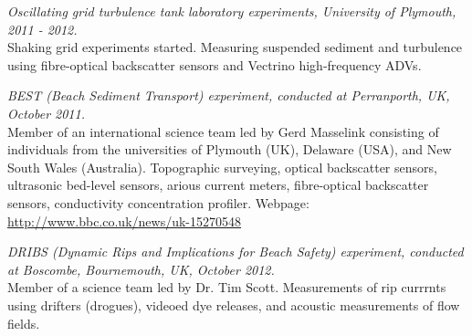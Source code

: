 \documentclass[margin,line]{resume}
\begin{document}
\begin{resume}
\begin{footnotesize}
    {\sl Oscillating grid turbulence tank laboratory experiments, University of Plymouth, 2011 - 2012.} \\
    Shaking grid experiments started. Measuring suspended sediment and turbulence using fibre-optical backscatter sensors and Vectrino high-frequency ADVs.

    {\sl BEST (Beach Sediment Transport) experiment, conducted at Perranporth, UK, October 2011.} \\
    Member of an international science team led by Gerd Masselink consisting of individuals from the universities of Plymouth (UK), Delaware (USA), and New South Wales (Australia). Topographic surveying, optical backscatter sensors, ultrasonic bed-level sensors, arious current meters, fibre-optical backscatter sensors, conductivity concentration profiler. Webpage: \url{http://www.bbc.co.uk/news/uk-15270548}

{\sl DRIBS (Dynamic Rips and Implications for Beach Safety) experiment, conducted at Boscombe, Bournemouth, UK, October 2012.} \\
    Member of a science team led by Dr. Tim Scott. Measurements of rip currrnts using drifters (drogues), videoed dye releases, and acoustic measurements of flow fields.


\end{footnotesize}

 


\end{resume}
\end{document}
